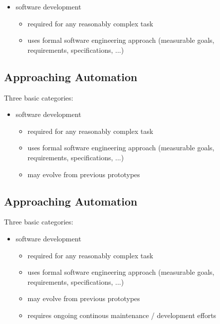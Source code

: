 \documentclass[xga]{xdvislides}
\begin{document}
\begin{itemize}
	\item software development
		\begin{itemize}
			\item required for any reasonably complex task
			\item uses formal software engineering approach (measurable goals,
				requirements, specifications, ...)
		\end{itemize}
\end{itemize}

\subsection{Approaching Automation}
Three basic categories:
\\

\begin{itemize}
	\item software development
		\begin{itemize}
			\item required for any reasonably complex task
			\item uses formal software engineering approach (measurable goals,
				requirements, specifications, ...)
			\item may evolve from previous prototypes
		\end{itemize}
\end{itemize}


\subsection{Approaching Automation}
Three basic categories:
\\

\begin{itemize}
	\item software development
		\begin{itemize}
			\item required for any reasonably complex task
			\item uses formal software engineering approach (measurable goals,
				requirements, specifications, ...)
			\item may evolve from previous prototypes
			\item requires ongoing continous maintenance / development efforts
		\end{itemize}
\end{itemize}
\end{document}
